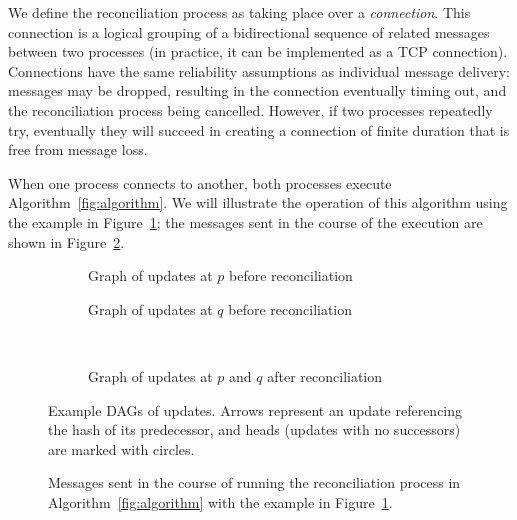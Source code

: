 \documentclass[a4paper,anonymous,USenglish]{lipics-v2019}
\begin{document}
We define the reconciliation process as taking place over a \emph{connection}.
This connection is a logical grouping of a bidirectional sequence of related messages between two processes (in practice, it can be implemented as a TCP connection).
Connections have the same reliability assumptions as individual message delivery: messages may be dropped, resulting in the connection eventually timing out, and the reconciliation process being cancelled.
However, if two processes repeatedly try, eventually they will succeed in creating a connection of finite duration that is free from message loss.

When one process connects to another, both processes execute Algorithm~\ref{fig:algorithm}.
We will illustrate the operation of this algorithm using the example in Figure~\ref{fig:example-dags}; the messages sent in the course of the execution are shown in Figure~\ref{fig:messages}.

\begin{figure}[p]
    \centering
    \begin{subfigure}{0.45\textwidth}
    
    \caption{Graph of updates at $p$ before reconciliation}
    \end{subfigure}\hfill
    \begin{subfigure}{0.45\textwidth}
    
    \caption{Graph of updates at $q$ before reconciliation}
    \end{subfigure}\\[10pt]
    \begin{subfigure}{0.4\textwidth}
    
    \caption{Graph of updates at $p$ and $q$ after reconciliation}
    \end{subfigure}
    \caption{Example DAGs of updates. Arrows represent an update referencing the hash of its predecessor, and heads (updates with no successors) are marked with circles.}
    \label{fig:example-dags}
\end{figure}

\begin{figure}[p]
    
    \caption{Messages sent in the course of running the reconciliation process in Algorithm~\ref{fig:algorithm} with the example in Figure~\ref{fig:example-dags}.}
    \label{fig:messages}
\end{figure}
\end{document}
